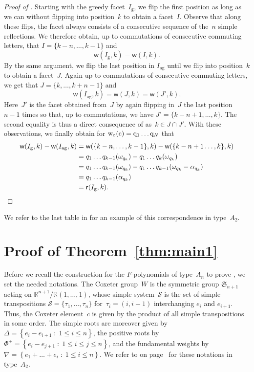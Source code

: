 \documentclass[ALCO,Unicode,ThmDefs]{cedram}
\newcommand{\RR}{\mathbb{R}}
\newcommand{\Sym}{{\mathfrak{S}}}
\newcommand{\Phiplus}{\Phi^+}
\newcommand{\greedy}{I_{\operatorname{g}}}
\newcommand{\antigreedy}{I_{\operatorname{ag}}}
\newcommand{\sq}[1]{{\rm #1}}
\newcommand{\q}{\sq{q}}
\newcommand{\sref}{\mathcal{S}}
\newcommand{\sfr}{\mathsf{r}}
\newcommand{\sfw}{\mathsf{w}}
\newcommand{\wo}{{w_\circ}}
\newcommand{\sw}[2]{\sq{#1}(\sq{#2})}
\newcommand{\cwo}[1]{\sw{\wo}{#1}}
\newcommand{\Root}[2]{{\sfr}(#1,#2)}
\newcommand{\Weight}[2]{{\sfw}(#1,#2)}
\newcommand{\set}[2]{\left\{ #1 \;:\; #2 \right\}}
\begin{document}
\begin{proof}[Proof of ]
Starting with the greedy facet~$\greedy$, we flip the first position as long as we can without flipping into position~$k$ to obtain a facet~$I$. Observe that along these flips, the facet always consists of a consecutive sequence of the~$n$ simple reflections. We therefore obtain, up to commutations of consecutive commuting letters, that $I = \{k-n,\dots,k-1\}$ and
\[
\Weight{\greedy}{k} = \Weight{I}{k}.
\]
By the same argument, we flip the last position in $\antigreedy$ until we flip into position~$k$ to obtain a facet~$J$. Again up to commutations of consecutive commuting letters, we get that $J = \{k,\dots,k+n-1\}$ and
\[
\Weight{\antigreedy}{k} = \Weight{J}{k} = \Weight{J'}{k}.
\]
Here~$J'$ is the facet obtained from~$J$ by again flipping in~$J$ the last position~$n-1$ times so that, up to commutations, we have $J' = \{k-n+1,\dots,k\}$. The second equality is thus a direct consequence of  as~$k \in J \cap J'$. With these observations, we finally obtain for $\cwo{c} = \q_1\dots\q_N$ that
\begin{align*}
\Weight{\greedy}{k} - \Weight{\antigreedy}{k} &= \Weight{\{k-n,\dots,k-1\}}{k} - \Weight{\{k-n+1\dots,k\}}{k} \\
&= q_1\dots q_{k-1}(\omega_{q_k}) - q_1\dots q_{k}(\omega_{q_k}) \\
&= q_1\dots q_{k-1}(\omega_{q_k}) - q_1\dots q_{k-1}(\omega_{q_k} - \alpha_{q_k}) \\
&= q_1\dots q_{k-1}(\alpha_{q_k}) \\
&= \Root{\greedy}{k}. \qedhere
\end{align*}
\end{proof}

We refer to the last table in  for an example of this correspondence in type~$A_2$.


\section{Proof of Theorem~\ref{thm:main1}}\label{sec:proofmain1}

Before we recall the construction for the $F$-polynomials of type~$A_n$ to prove , we set the needed notations. The Coxeter group~$W$ is the symmetric group $\Sym_{n+1}$ acting on $\RR^{n+1} \big/ \RR(1,\dots,1)$, whose simple system~$\sref$ is the set of simple transpositions $\sref=\{\tau_1,\dots,\tau_n\}$ for~$\tau_i = (i,i+1)$ interchanging $e_i$ and $e_{i+1}$. Thus, the Coxeter element~$c$ is given by the product of all simple transpositions in some order. The simple roots are moreover given by $\Delta = \set{e_i - e_{i+1}}{1 \leq i \leq n}$, the positive roots by $\Phiplus = \set{ e_i - e_{j+1}}{1 \leq i \leq j \leq n}$, and the fundamental weights by $\nabla = \set{e_1+\dots+e_i}{1 \leq i \leq n}$. We refer to  on page~\pageref{ex:subwordA2} for these notations in type~$A_2$.
\end{document}
